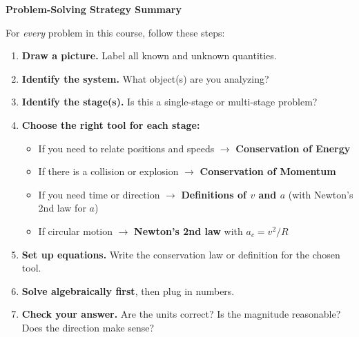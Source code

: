 \documentclass[12pt,letterpaper]{article}
\begin{document}
\begin{conceptbox}
\textbf{Problem-Solving Strategy Summary}

For \emph{every} problem in this course, follow these steps:
\begin{enumerate}
    \item \textbf{Draw a picture.} Label all known and unknown quantities.
    \item \textbf{Identify the system.} What object(s) are you analyzing?
    \item \textbf{Identify the stage(s).} Is this a single-stage or multi-stage problem?
    \item \textbf{Choose the right tool for each stage:}
    \begin{itemize}
        \item If you need to relate positions and speeds $\rightarrow$ \textbf{Conservation of Energy}
        \item If there is a collision or explosion $\rightarrow$ \textbf{Conservation of Momentum}
        \item If you need time or direction $\rightarrow$ \textbf{Definitions of $v$ and $a$} (with Newton's 2nd law for $a$)
        \item If circular motion $\rightarrow$ \textbf{Newton's 2nd law} with $a_c = v^2/R$
    \end{itemize}
    \item \textbf{Set up equations.} Write the conservation law or definition for the chosen tool.
    \item \textbf{Solve algebraically first}, then plug in numbers.
    \item \textbf{Check your answer.} Are the units correct? Is the magnitude reasonable? Does the direction make sense?
\end{enumerate}
\end{conceptbox}
\end{document}
